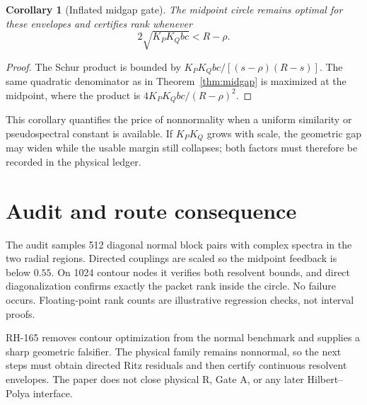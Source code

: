 \documentclass[12pt]{article}
\newtheorem{corollary}[theorem]{Corollary}
\begin{document}
\begin{corollary}[Inflated midgap gate]
The midpoint circle remains optimal for these envelopes and certifies rank
whenever
\[
 2\sqrt{K_PK_Qbc}<R-\rho.
\]
\end{corollary}
\begin{proof}
The Schur product is bounded by
$K_PK_Qbc/[(s-\rho)(R-s)]$.  The same quadratic denominator as in
Theorem~\ref{thm:midgap} is maximized at the midpoint, where the product is
$4K_PK_Qbc/(R-\rho)^2$.
\end{proof}

This corollary quantifies the price of nonnormality when a uniform similarity
or pseudospectral constant is available.  If $K_PK_Q$ grows with scale, the
geometric gap may widen while the usable margin still collapses; both factors
must therefore be recorded in the physical ledger.

\section{Audit and route consequence}
The audit samples 512 diagonal normal block pairs with complex spectra in
the two radial regions.  Directed couplings are scaled so the midpoint
feedback is below $0.55$.  On 1024 contour nodes it verifies both resolvent
bounds, and direct diagonalization confirms exactly the packet rank inside
the circle.  No failure occurs.  Floating-point rank counts are illustrative
regression checks, not interval proofs.

RH-165 removes contour optimization from the normal benchmark and supplies a
sharp geometric falsifier.  The physical family remains nonnormal, so the
next steps must obtain directed Ritz residuals and then certify continuous
resolvent envelopes.  The paper does not close physical R, Gate A, or any
later Hilbert--Polya interface.



\end{document}
